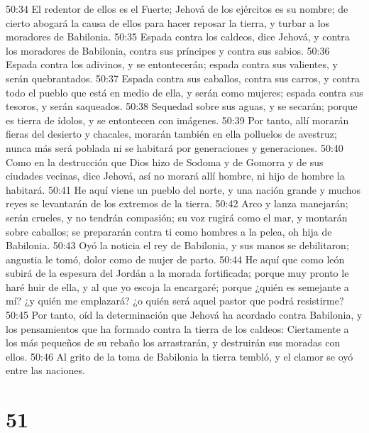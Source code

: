 50:34 El redentor de ellos es el Fuerte; Jehová de los ejércitos es su nombre; de cierto abogará la causa de ellos para hacer reposar la tierra, y turbar a los moradores de Babilonia.  
50:35 Espada contra los caldeos, dice Jehová, y contra los moradores de Babilonia, contra sus príncipes y contra sus sabios.  
50:36 Espada contra los adivinos, y se entontecerán; espada contra sus valientes, y serán quebrantados.  
50:37 Espada contra sus caballos, contra sus carros, y contra todo el pueblo que está en medio de ella, y serán como mujeres; espada contra sus tesoros, y serán saqueados.  
50:38 Sequedad sobre sus aguas, y se secarán; porque es tierra de ídolos, y se entontecen con imágenes.  
50:39 Por tanto, allí morarán fieras del desierto y chacales,  morarán también en ella polluelos de avestruz; nunca más será poblada ni se habitará por generaciones y generaciones.  
50:40 Como en la destrucción que Dios hizo de Sodoma y de Gomorra y de sus ciudades vecinas, dice Jehová, así no morará allí hombre, ni hijo de hombre la habitará.  
50:41 He aquí viene un pueblo del norte, y una nación grande y muchos reyes se levantarán de los extremos de la tierra.  
50:42 Arco y lanza manejarán; serán crueles, y no tendrán compasión; su voz rugirá como el mar, y montarán sobre caballos; se prepararán contra ti como hombres a la pelea, oh hija de Babilonia.  
50:43 Oyó la noticia el rey de Babilonia, y sus manos se debilitaron; angustia le tomó, dolor como de mujer de parto.  
50:44 He aquí que como león subirá de la espesura del Jordán a la morada fortificada; porque muy pronto le haré huir de ella, y al que yo escoja la encargaré; porque ¿quién es semejante a mí? ¿y quién me emplazará? ¿o quién será aquel pastor que podrá resistirme?  
50:45 Por tanto, oíd la determinación que Jehová ha acordado contra Babilonia, y los pensamientos que ha formado contra la tierra de los caldeos: Ciertamente a los más pequeños de su rebaño los arrastrarán, y destruirán sus moradas con ellos.  
50:46 Al grito de la toma de Babilonia la tierra tembló, y el clamor se oyó entre las naciones.  

\chapter{51}

